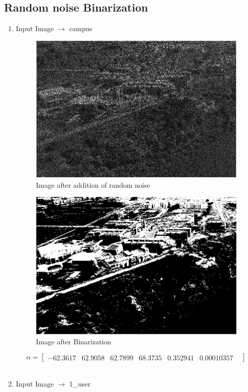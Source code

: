 \documentclass{article}
\begin{document}
    \subsection{Random noise Binarization}
    \begin{enumerate}
        \item Input Image $\longrightarrow$ campus
    \begin{figure}[H]
        \centering
        \includegraphics[width=0.75\linewidth]{5.png}
        \caption{Image after addition of random noise}
        \label{fig:Image after addition of random noise}
    \end{figure}
    \begin{figure}[H]
        \centering
        \includegraphics[width=0.75\linewidth]{6.png}
        \caption{Image after Binarization}
        \label{fig:Image after Binarization}
    \end{figure}
    \[
    \alpha=
    \begin{bmatrix} 
     -62.3617 &
     62.9058 &
     62.7899 &
     68.3735 &
     0.352941 &
     0.00010357 &
    \end{bmatrix}
    \]
    \\
    \item Input Image $\longrightarrow$ 1{\_}user

\end{enumerate}
\end{document}
